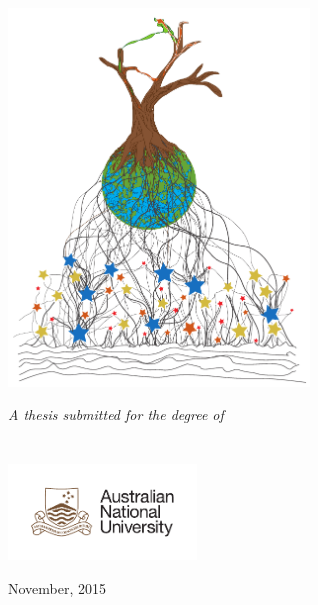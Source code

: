 \begin{titlepage}
\begin{center}
\vspace{1cm}
\includegraphics[width=0.6\textwidth]{gfx/front_cover} \\ \bigskip  
\vspace{1cm}

\large \textit{A thesis submitted for the degree of \degreename}\\[0.7cm] %
\groupname\\
\deptname\\ %


\includegraphics[width=5cm]{gfx/ANU_LOGO_cmyk_56mm}

{\normalsize November, 2015}\\[2cm] %

\end{center}
\end{titlepage}


